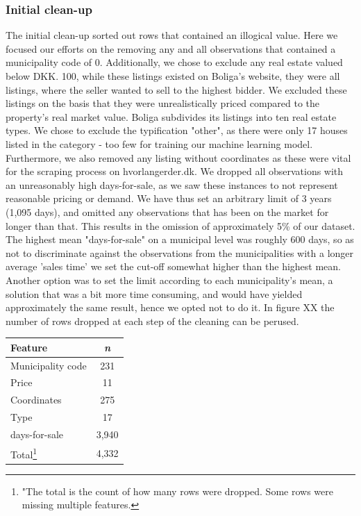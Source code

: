 \documentclass[12pt,a4paper]{article}
\begin{document}
\subsubsection{Initial clean-up}
The initial clean-up sorted out rows that contained an illogical value. Here we focused our efforts on the removing any and all observations that contained a municipality code of 0. Additionally, we chose to exclude any real estate valued below DKK. 100, while these listings existed on Boliga's website, they were all listings, where the seller wanted  to sell to the highest bidder. We excluded these listings on the basis that they were unrealistically priced compared to the property's real market value.\newline
Boliga subdivides its listings into ten real estate types. We chose to exclude the typification "other", as there were only 17 houses listed in the category - too few for training our machine learning model. Furthermore, we also removed any listing without coordinates as these were vital for the scraping process on hvorlangerder.dk.\newline
We dropped all observations with an unreasonably high days-for-sale, as we saw these instances to not  represent reasonable pricing or demand. We have thus set an arbitrary limit of 3 years (1,095 days), and omitted any observations that has been on the market for longer than that. This results in the omission of approximately 5\% of our dataset. The highest mean "days-for-sale" on a municipal level was roughly 600 days, so as not to discriminate against the observations from the municipalities with a longer average 'sales time' we set the cut-off somewhat higher than the highest mean. Another option was to set the limit according to each municipality's mean, a solution that was a bit more time consuming, and would have yielded approximately the same result, hence we opted not to do it.
In figure XX the number of rows dropped at each step of the cleaning can be perused.
\begin{center}
\begin{tabular}{|l|c|}
\hline 
Feature & \emph{n} \\
\hline 
Municipality code & 231 \\ 
\hline 
Price & 11 \\ 
\hline 
Coordinates & 275 \\ 
\hline 
Type & 17 \\ 
\hline 
days-for-sale & 3,940\\
\hline 
Total\footnote{"The total is the count of how many rows were dropped. Some rows were missing multiple features.} & 4,332\\
\hline
\end{tabular} 
\end{center}
\end{document}
